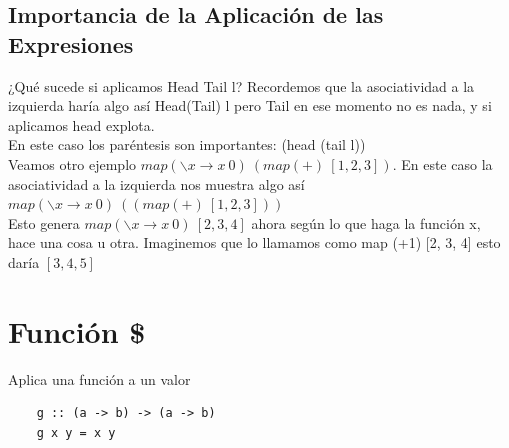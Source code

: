 \documentclass[10pt,a4paper]{article}
\begin{document}
\subsection*{Importancia de la Aplicación de las Expresiones}
¿Qué sucede si aplicamos Head Tail l? Recordemos que la asociatividad a la izquierda haría algo así Head(Tail) l pero Tail en ese momento no es nada, y si aplicamos head explota. \\
En este caso los paréntesis son importantes: (head (tail l)) \\

Veamos otro ejemplo $map(\backslash x \rightarrow x \ 0) \ (map(+) \ [1, 2, 3])$. En este caso la asociatividad a la izquierda nos muestra algo así $map(\backslash x \rightarrow x \ 0) \ ((map(+) \ [1, 2, 3]))$ \\
Esto genera $map(\backslash x \rightarrow x \ 0) \ [2, 3, 4]$ ahora según lo que haga la función x, hace una cosa u otra. Imaginemos que lo llamamos como map (+1) [2, 3, 4] esto daría $[3, 4, 5]$
\section*{Función \$}
Aplica una función a un valor
\begin{lstlisting}
    g :: (a -> b) -> (a -> b)
    g x y = x y 
\end{lstlisting}
\end{document}
